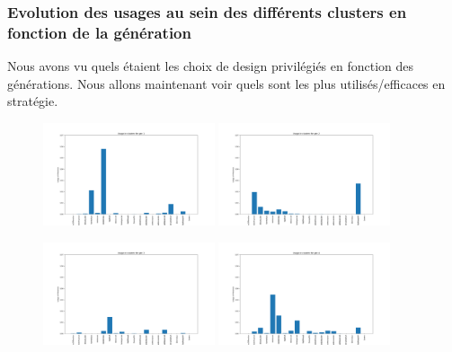 \documentclass[a4paper,12pt]{article}
\begin{document}
\subsubsection{Evolution des usages au sein des différents clusters en fonction de la génération}

Nous avons vu quels étaient les choix de design privilégiés en fonction des générations. Nous allons maintenant voir quels sont les plus utilisés/efficaces en stratégie.

\begin{figure}[!h]
    \centering

    \includegraphics[width=0.45\textwidth]{Clustering/usage_gen/gen1.png}
    \includegraphics[width=0.45\textwidth]{Clustering/usage_gen/gen2.png}
    

    \vspace{1em}  %

    \includegraphics[width=0.45\textwidth]{Clustering/usage_gen/gen3.png}
    \includegraphics[width=0.45\textwidth]{Clustering/usage_gen/gen4.png}
    


\end{figure}
\end{document}
